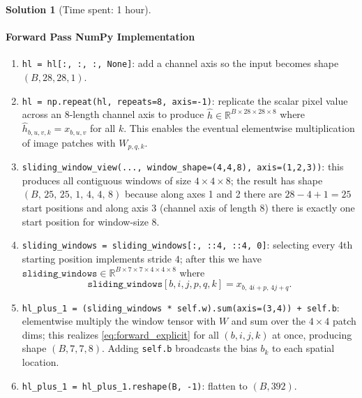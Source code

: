\documentclass[11pt, reqno, letterpaper, twoside]{amsart}
\theoremstyle{plain}
\theoremstyle{definition}
\newtheorem{solution}[theorem]{Solution}
\begin{document}
\begin{solution}[Time spent: 1 hour]
\begin{enumerate}
\paragraph{Forward Pass NumPy Implementation}
\begin{enumerate}
  \item \texttt{hl = hl[:, :, :, None]}: add a channel axis so the input becomes shape $(B,28,28,1)$.
  \item \texttt{hl = np.repeat(hl, repeats=8, axis=-1)}: replicate the scalar pixel value across an 8-length channel axis to produce $\hat h\in\mathbb{R}^{B\times 28\times 28\times 8}$ where $\hat h_{b,u,v,k} = x_{b,u,v}$ for all $k$. This enables the eventual elementwise multiplication of image patches with $W_{p,q,k}$.
  \item \texttt{sliding\_window\_view(..., window\_shape=(4,4,8), axis=(1,2,3))}: this produces all contiguous windows of size $4 \times 4 \times 8$; the result has shape $(B,\,25,\,25,\,1,\,4,\,4,\,8)$ because along axes 1 and 2 there are $28-4+1 = 25$ start positions and along axis 3 (channel axis of length 8) there is exactly one start position for window-size 8.
  \item \texttt{sliding\_windows = sliding\_windows[:, ::4, ::4, 0]}: selecting every 4th starting position implements stride $4$; after this we have $\texttt{sliding\_windows}\in\mathbb{R}^{B\times 7\times 7\times 4\times 4 \times 8}$ where
    \[
    \texttt{sliding\_windows}[b,i,j,p,q,k] = x_{b,\,4i+p,\,4j+q}.
    \]
  \item \texttt{hl\_plus\_1 = (sliding\_windows * self.w).sum(axis=(3,4)) + self.b}: elementwise multiply the window tensor with $W$ and sum over the $4\times4$ patch dims; this realizes \eqref{eq:forward_explicit} for all $(b,i,j,k)$ at once, producing shape $(B,7,7,8)$. Adding \texttt{self.b} broadcasts the bias $b_k$ to each spatial location.
  \item \texttt{hl\_plus\_1 = hl\_plus\_1.reshape(B, -1)}: flatten to $(B,392)$.
\end{enumerate}


\end{enumerate}
\end{solution}
\end{document}
